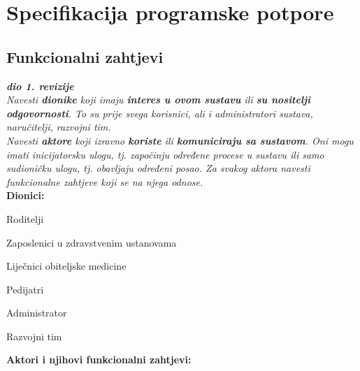 \chapter{Specifikacija programske potpore}
		
	\section{Funkcionalni zahtjevi}
			
			\textbf{\textit{dio 1. revizije}}\\
			
			\textit{Navesti \textbf{dionike} koji imaju \textbf{interes u ovom sustavu} ili  \textbf{su nositelji odgovornosti}. To su prije svega korisnici, ali i administratori sustava, naručitelji, razvojni tim.}\\
				
			\textit{Navesti \textbf{aktore} koji izravno \textbf{koriste} ili \textbf{komuniciraju sa sustavom}. Oni mogu imati inicijatorsku ulogu, tj. započinju određene procese u sustavu ili samo sudioničku ulogu, tj. obavljaju određeni posao. Za svakog aktora navesti funkcionalne zahtjeve koji se na njega odnose.}\\
			
			
			\noindent \textbf{Dionici:}
			
			\begin{packed_enum}
				
				\item Roditelji
				\item Zaposlenici u zdravstvenim ustanovama
					\begin{packed_enum}
						\item Liječnici obiteljske medicine
						\item Pedijatri
					\end{packed_enum}				
				\item Administrator
				\item Razvojni tim
				
			\end{packed_enum}
			
			\noindent \textbf{Aktori i njihovi funkcionalni zahtjevi:}
			
